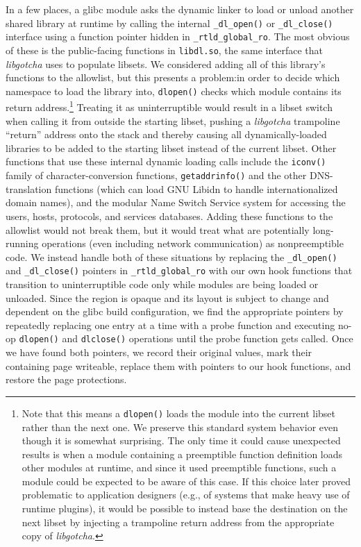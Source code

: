 In a few places, a glibc module asks the dynamic linker to load or unload another
shared library at runtime by calling the internal \texttt{\_dl\_open()} or
\texttt{\_dl\_close()} interface using a function pointer hidden in
\texttt{\_rtld\_global\_ro}.  The most obvious of these is the public-facing
functions in \texttt{libdl.so}, the same interface that \textit{libgotcha} uses to
populate libsets.  We considered adding all of this library's functions to the
allowlist, but this presents a problem:\@ in order to decide which namespace to load
the library into, \texttt{dlopen()} checks which module contains its return
address.\footnote{Note that this means a \texttt{dlopen()} loads the module into the
current libset rather than the next one.  We preserve this standard system behavior
even though it is somewhat surprising.  The only time it could cause unexpected
results is when a module containing a preemptible function definition loads other
modules at runtime, and since it used preemptible functions, such a module could be
expected to be aware of this case.  If this choice later proved problematic to
application designers (e.g., of systems that make heavy use of runtime plugins), it
would be possible to instead base the destination on the next libset by injecting a
trampoline return address from the appropriate copy of \textit{libgotcha}.}
Treating it as uninterruptible would result in a libset switch when calling it from
outside the starting libset, pushing a \textit{libgotcha} trampoline ``return''
address onto the stack and thereby causing all dynamically-loaded libraries to be
added to the starting libset instead of the current libset.  Other functions that
use these internal dynamic loading calls include the \texttt{iconv()} family of
character-conversion functions, \texttt{getaddrinfo()} and the other DNS-translation
functions (which can load GNU Libidn to handle internationalized domain names), and
the modular Name Switch Service system for accessing the users, hosts, protocols,
and services databases.  Adding these functions to the allowlist would not break
them, but it would treat what are potentially long-running operations (even including
network communication) as nonpreemptible code.  We instead handle both of these
situations by
replacing the \texttt{\_dl\_open()} and \texttt{\_dl\_close()} pointers in
\texttt{\_rtld\_global\_ro} with our own hook functions that transition to
uninterruptible code only while modules are being loaded or unloaded.  Since the
region is opaque and its layout is subject to change and dependent on the glibc build
configuration, we find the appropriate
pointers by repeatedly replacing one entry at a time with a probe function and
executing no-op
\texttt{dlopen()} and \texttt{dlclose()} operations until the probe function gets
called.  Once we have found both pointers, we record their original values, mark
their containing page writeable, replace them with pointers to our hook functions,
and restore the page protections.


